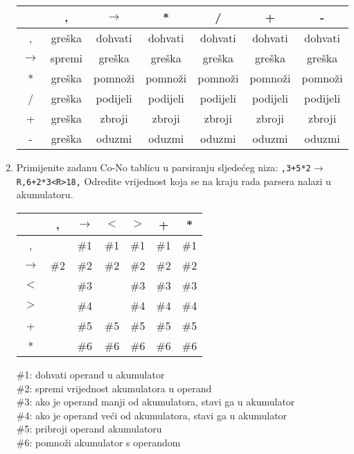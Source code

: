 \documentclass[times, 12pt, utf8]{book}
\begin{document}
\begin{enumerate}[resume]
\begin{tabular}{ | c | c | c | c | c | c | c | } \hline
 & , & \(\to\) & * & / & + & - \\ \hline
, & greška & dohvati & dohvati & dohvati & dohvati & dohvati  \\ \hline
\(\to\) & spremi & greška & greška & greška & greška & greška \\ \hline
* & greška & pomnoži & pomnoži & pomnoži & pomnoži & pomnoži \\ \hline
/ & greška & podijeli & podijeli & podijeli & podijeli & podijeli \\ \hline
+ & greška & zbroji & zbroji & zbroji & zbroji & zbroji  \\ \hline
- & greška & oduzmi & oduzmi & oduzmi & oduzmi & oduzmi \\ \hline
\end{tabular}

\item
Primijenite zadanu Co-No tablicu u parsiranju sljedećeg niza: \texttt{,3+5*2\(\to\)R,6+2*3<R>18,}
Odredite vrijednost koja se na kraju rada parsera nalazi u akumulatoru. \cite[str.~83-84]{udzbenik} \cite{auditorne}

\begin{tabular}{ | c | c | c | c | c | c | c | } \hline
 & , & \(\to\) & $<$ & $>$ & + & * \\ \hline
, &  & \#1 & \#1 & \#1 & \#1 & \#1  \\ \hline
\(\to\) & \#2 & \#2 & \#2 & \#2 & \#2 & \#2 \\ \hline
$<$ &  & \#3 &  & \#3 & \#3 & \#3 \\ \hline
$>$ &  & \#4 &  & \#4 & \#4 & \#4 \\ \hline
+ &  & \#5 & \#5 & \#5 & \#5 & \#5  \\ \hline
* &  & \#6 & \#6 & \#6 & \#6 & \#6 \\ \hline
\end{tabular}

\#1:	dohvati operand u akumulator \\
\#2:	spremi vrijednost akumulatora u operand \\
\#3:	ako je operand manji od akumulatora, stavi ga u akumulator \\
\#4:	ako je operand veći od akumulatora, stavi ga u akumulator \\
\#5:	pribroji operand akumulatoru \\
\#6:	pomnoži akumulator s operandom


\end{enumerate}
\end{document}
